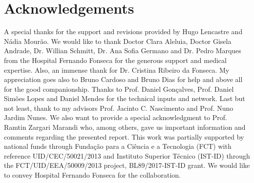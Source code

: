 
\section{Acknowledgements}
\label{sec:sec012}

A special thanks for the support and revisions provided by Hugo Lencastre and N\'{a}dia Mour\~{a}o.
We would like to thank Doctor Clara Aleluia, Doctor Gisela Andrade, Dr. Willian Schmitt, Dr. Ana Sofia Germano and Dr. Pedro Marques from the Hospital Fernando Fonseca for the generous support and medical expertise.
Also, an immense thank for Dr. Cristina Ribeiro da Fonseca.
My appreciation goes also to Bruno Cardoso and Bruno Dias for help and above all for the good companionship.
Thanks to Prof. Daniel Gon\c{c}alves, Prof. Daniel Sim\~{o}es Lopes and Daniel Mendes for the technical inputs and network.
Last but not least, thank to my advisors Prof. Jacinto C. Nascimento and Prof. Nuno Jardim Nunes.
We also want to provide a special acknowledgment to Prof. Ramtin Zargari Marandi who, among others, gave us important information and comments regarding the presented report.
This work was partially supported by national funds through Funda\c{c}\~{a}o para a Ci\^{e}ncia e a Tecnologia (FCT) with reference UID/CEC/50021/2013 and Instituto Superior T\'{e}cnico (IST-ID) through the FCT/UID/EEA/50009/2013 project, BL89/2017-IST-ID grant.
We would like to convey Hospital Fernando Fonseca for the collaboration.

